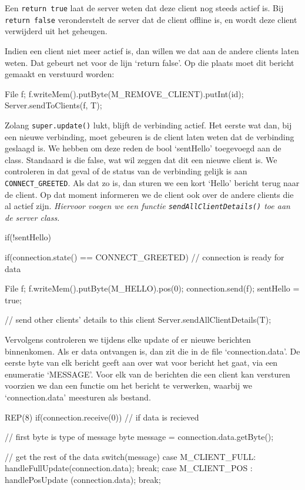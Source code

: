 Een \texttt{return true} laat de server weten dat deze client nog steeds actief is. Bij \texttt{return false} veronderstelt de server dat de client offline is, en wordt deze client verwijderd uit het geheugen.
	
Indien een client niet meer actief is, dan willen we dat aan de andere clients laten weten. Dat gebeurt net voor de lijn `return false'. Op die plaats moet dit bericht gemaakt en verstuurd worden:
\begin{code}
File f;
f.writeMem().putByte(M_REMOVE_CLIENT).putInt(id);
Server.sendToClients(f, T);
\end{code}

Zolang \texttt{super.update()} lukt, blijft de verbinding actief. Het eerste wat dan, bij een nieuwe verbinding, moet gebeuren is de client laten weten dat de verbinding geslaagd is. We hebben om deze reden de bool `sentHello' toegevoegd aan de class. Standaard is die false, wat wil zeggen dat dit een nieuwe client is. We controleren in dat geval of de status van de verbinding gelijk is aan \texttt{CONNECT\_GREETED}. Als dat zo is, dan sturen we een kort `Hello' bericht terug naar de client. Op dat moment informeren we de client ook over de andere clients die al actief zijn. \textsl{Hiervoor voegen we een functie \texttt{sendAllClientDetails()} toe aan de server class.}

\begin{code}
if(!sentHello)
{
	if(connection.state() == CONNECT_GREETED) // connection is ready for data
	{
		 File f;
		 f.writeMem().putByte(M_HELLO).pos(0);
		 connection.send(f);
		 sentHello = true;
		 
		 // send other clients' details to this client
		 Server.sendAllClientDetails(T);
	}
}
\end{code}

Vervolgens controleren we tijdens elke update of er nieuwe berichten binnenkomen. Als er data ontvangen is, dan zit die in de file `connection.data'. De eerste byte van elk bericht geeft aan over wat voor bericht het gaat, via een enumeratie `MESSAGE'. Voor elk van de berichten die een client kan versturen voorzien we dan een functie om het bericht te verwerken, waarbij we `connection.data' meesturen als bestand.

\begin{code}
REP(8) if(connection.receive(0)) // if data is recieved
{
	// first byte is type of message
	byte message = connection.data.getByte();
	
	// get the rest of the data
	switch(message)
	{
		 case M_CLIENT_FULL: handleFullUpdate(connection.data); break;
		 case M_CLIENT_POS : handlePosUpdate (connection.data); break;
	}
}
\end{code}

